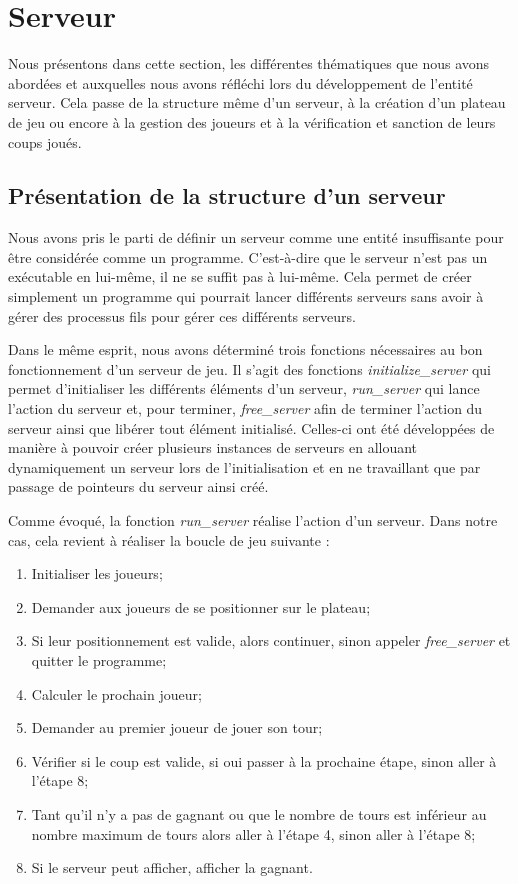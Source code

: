 \documentclass[11pt]{article}
\begin{document}
\newpage
\section{Serveur}

Nous présentons dans cette section, les différentes thématiques que nous avons abordées et auxquelles nous avons réfléchi lors du développement de l'entité serveur. Cela passe de la structure même d'un serveur, à la création d'un plateau de jeu ou encore à la gestion des joueurs et à la vérification et sanction de leurs coups joués.

\subsection{Présentation de la structure d'un serveur}

Nous avons pris le parti de définir un serveur comme une entité insuffisante pour être considérée comme un programme. C'est-à-dire que le serveur n'est pas un exécutable en lui-même, il ne se suffit pas à lui-même. Cela permet de créer simplement un programme qui pourrait lancer différents serveurs sans avoir à gérer des processus fils pour gérer ces différents serveurs.

Dans le même esprit, nous avons déterminé trois fonctions nécessaires au bon fonctionnement d'un serveur de jeu. Il s'agit des fonctions \textit{initialize\_server} qui permet d'initialiser les différents éléments d'un serveur, \textit{run\_server} qui lance l'action du serveur et, pour terminer, \textit{free\_server} afin de terminer l'action du serveur ainsi que libérer tout élément initialisé. Celles-ci ont été développées de manière à pouvoir créer plusieurs instances de serveurs en allouant dynamiquement un serveur lors de l'initialisation et en ne travaillant que par passage de pointeurs du serveur ainsi créé.

Comme évoqué, la fonction \textit{run\_server} réalise l'action d'un serveur. Dans notre cas, cela revient à réaliser la boucle de jeu suivante :
\begin{enumerate}
    \item Initialiser les joueurs;
    \item Demander aux joueurs de se positionner sur le plateau;
    \item Si leur positionnement est valide, alors continuer, sinon appeler \textit{free\_server} et quitter le programme;
    \item Calculer le prochain joueur;
    \item Demander au premier joueur de jouer son tour;
    \item Vérifier si le coup est valide, si oui passer à la prochaine étape, sinon aller à l'étape 8;
    \item Tant qu'il n'y a pas de gagnant ou que le nombre de tours est inférieur au nombre maximum de tours alors aller à l'étape 4, sinon aller à l'étape 8; 
    \item Si le serveur peut afficher, afficher la gagnant.
\end{enumerate}
\end{document}

